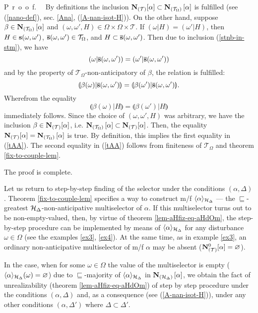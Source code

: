 \documentclass[sn-mathphys,Numbered,pdflatex]{sn-jnl}%
\theoremstyle{thmstyleone}%
\theoremstyle{thmstyletwo}%
\theoremstyle{thmstylethree}%
\renewcommand{\proof}{\par\mbox{P r o o f.}\ \ }
\newcommand{\stmb}[2]{{{\bf\overline{s}}(#1,#2)}}%
\newcommand{\stm}[2]{{{\bf s}(#1,#2)}}%
\newcommand{\res}[2]{\ensuremath{(#1|#2)}}%
\newcommand{\myLe}{\mathrel{\sqsubseteq}}%
\newcommand{\naOm}{\ensuremath{\Omega}}%
\newcommand{\naTc}{\ensuremath{\mathcal{T}}}%
\newcommand{\naN}{\AnaN{\naTc}{}}%
\newcommand{\naNo}[1]{\naN\setbox0=\hbox{\text{$#1$}}\ifdim\wd0=0pt\else[{#1}]\fi}%
\newcommand{\AnaN}[2]{\mathbf{N}_{(#1)}\setbox0=\hbox{\text{$#2$}}\ifdim\wd0=0pt\else\left[{#2}\right]\fi}%
\newcommand{\naNO}[1]{\naN^0\setbox0=\hbox{\text{$#1$}}\ifdim\wd0=0pt\else[{#1}]\fi}%
\newcommand{\sres}[2]{\llparenthesis#1|#2\rrparenthesis}%
\newcommand{\Ana}[2]{\ensuremath{\langle{#1}\rangle_{#2}}}%
\newcommand{\fref}[1]{{\rm(\ref{#1})}}   %
\begin{document}
\proof
By definitions the inclusion $\naNo\alpha\subset\AnaN{\naTc_\naOm}\alpha$ is fulfilled (see \fref{nano-def}, sec. \ref{Ana}, \fref{A-nan-isot-H}).
On the other hand, suppose $\beta\in\AnaN{\naTc_\naOm}\alpha$ and $(\omega,\omega',H)\in\naOm\times\naOm\times\naTc$.
If $\res\omega H=\res{\omega'} H$, then $H\in\stm\omega{\omega'}$, $\stmb\omega{\omega'}\in\naTc_\naOm$, and $H\subset\stmb\omega{\omega'}$.
Then due to inclusion \fref{stnb-in-stm}, we have
$$
\res\omega{\stmb\omega{\omega'}}=\res{\omega'}{\stmb\omega{\omega'}}
$$
and by the property of $\naTc_\naOm$-non-anticipatory of $\beta$, the relation is fulfilled:
$$
\sres{\beta(\omega)}{\stmb\omega{\omega'}}=\sres{\beta(\omega')}{\stmb\omega{\omega'}}.
$$
Wherefrom the equality
$$
\sres{\beta(\omega)}{H}=\sres{\beta(\omega')}{H}
$$
immediately follows.
Since the choice of $(\omega,\omega',H)$ was arbitrary, we have the inclusion $\beta\in\naNo\alpha$, i.e. $\AnaN{\naTc_\naOm}\alpha\subset\naNo\alpha$.
Then, the equality $\naNo\alpha=\AnaN{\naTc_\naOm}\alpha$ is true.
By definition, this implies the first equality in \fref{tAA}.
The second equality in \fref{tAA} follows from finiteness of $\naTc_\naOm$ and theorem \ref{fix-to-couple-lem}.

The proof is complete.

\bigskip

Let us return to step-by-step finding of the selector under the conditions $(\alpha,\Delta)$.
Theorem \ref{fix-to-couple-lem} specifies a way to construct m/f $\Ana\alpha{{\cal H}_\Delta}$ --- the $\myLe$-greatest ${\cal H}_\Delta$-non-anticipative multiselector of $\alpha$.
If this multiselector turns out to be non-empty-valued, then, by virtue of theorem \ref{lem-aHfiz-eq-aHdOm}, the step-by-step procedure can be implemented by means of  $\Ana\alpha{{\cal H}_\Delta}$ for any disturbance $\omega\in\naOm$ (see the examples \ref{ex3}, \ref{ex4}).
At the same time, as in example \ref{ex3}, an ordinary non-anticipative multiselector of m/f $\alpha$ may be absent ($\naNO\alpha=\varnothing$).

In the case, when for some $\omega\in\naOm$ the value of the multiselector is empty ($\Ana\alpha{{\cal H}_\Delta}(\omega)=\varnothing$) due to $\myLe$-majority of $\Ana\alpha{{\cal H}_\Delta}$ in $\AnaN{{\cal H}_\Delta}\alpha$, we obtain the fact of unrealizability (theorem \ref{lem-aHfiz-eq-aHdOm}) of step by step procedure under the conditions $(\alpha,\Delta)$ and, as a consequence (see \fref{A-nan-isot-H}), under any other conditions $(\alpha,\Delta')$ where $\Delta\subset\Delta'$.
\end{document}
